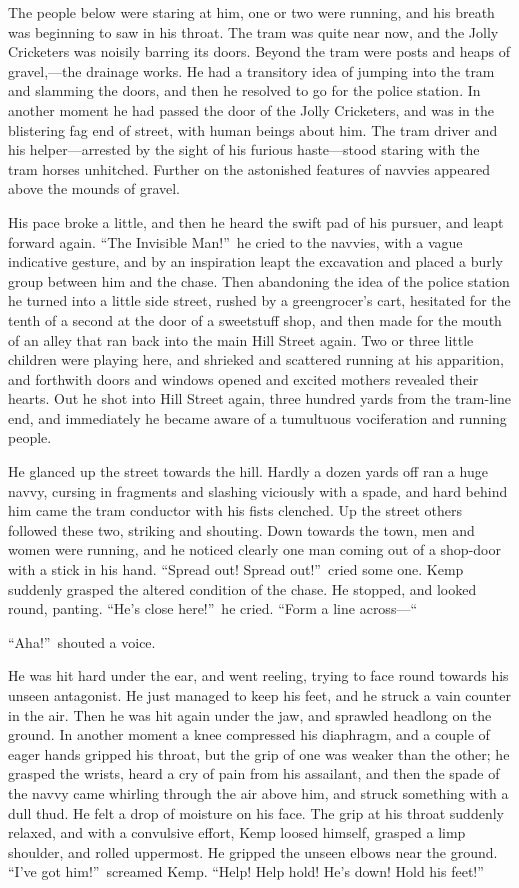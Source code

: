 The people below were staring at him, one or two were running, and his breath was beginning to saw in his throat. The tram was quite near now, and the Jolly Cricketers was noisily barring its doors. Beyond the tram were posts and heaps of gravel,—the drainage works. He had a transitory idea of jumping into the tram and slamming the doors, and then he resolved to go for the police station. In another moment he had passed the door of the Jolly Cricketers, and was in the blistering fag end of street, with human beings about him. The tram driver and his helper—arrested by the sight of his furious haste—stood staring with the tram horses unhitched. Further on the astonished features of navvies appeared above the mounds of gravel.

His pace broke a little, and then he heard the swift pad of his pursuer, and leapt forward again. “The Invisible Man!”\ he cried to the navvies, with a vague indicative gesture, and by an inspiration leapt the excavation and placed a burly group between him and the chase. Then abandoning the idea of the police station he turned into a little side street, rushed by a greengrocer’s cart, hesitated for the tenth of a second at the door of a sweetstuff shop, and then made for the mouth of an alley that ran back into the main Hill Street again. Two or three little children were playing here, and shrieked and scattered running at his apparition, and forthwith doors and windows opened and excited mothers revealed their hearts. Out he shot into Hill Street again, three hundred yards from the tram-line end, and immediately he became aware of a tumultuous vociferation and running people.

He glanced up the street towards the hill. Hardly a dozen yards off ran a huge navvy, cursing in fragments and slashing viciously with a spade, and hard behind him came the tram conductor with his fists clenched. Up the street others followed these two, striking and shouting. Down towards the town, men and women were running, and he noticed clearly one man coming out of a shop-door with a stick in his hand. “Spread out! Spread out!”\ cried some one. Kemp suddenly grasped the altered condition of the chase. He stopped, and looked round, panting. “He’s close here!”\ he cried. “Form a line across—“

“Aha!”\ shouted a voice.

He was hit hard under the ear, and went reeling, trying to face round towards his unseen antagonist. He just managed to keep his feet, and he struck a vain counter in the air. Then he was hit again under the jaw, and sprawled headlong on the ground. In another moment a knee compressed his diaphragm, and a couple of eager hands gripped his throat, but the grip of one was weaker than the other; he grasped the wrists, heard a cry of pain from his assailant, and then the spade of the navvy came whirling through the air above him, and struck something with a dull thud. He felt a drop of moisture on his face. The grip at his throat suddenly relaxed, and with a convulsive effort, Kemp loosed himself, grasped a limp shoulder, and rolled uppermost. He gripped the unseen elbows near the ground. “I’ve got him!”\ screamed Kemp. “Help! Help hold! He’s down! Hold his feet!”


